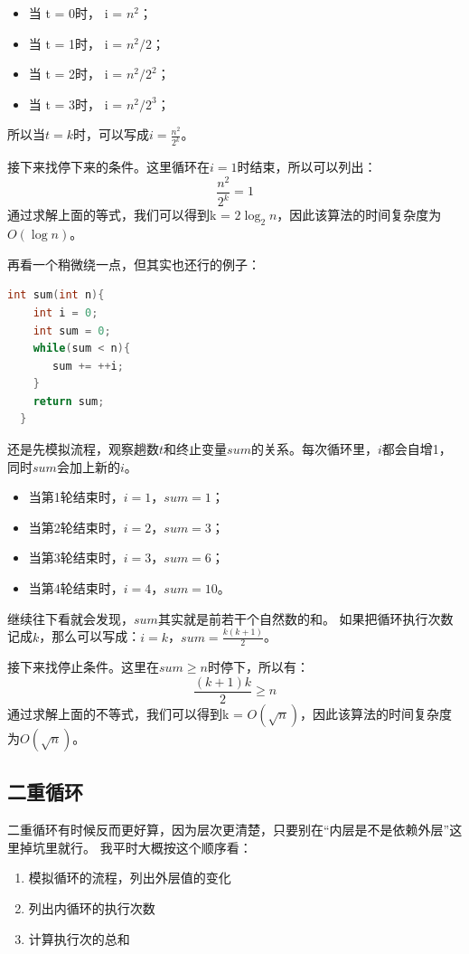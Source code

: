 \documentclass[b5paper,11pt]{article}
\begin{document}
\begin{itemize}
  \item 当 t = 0时， i = $n^2$；
  \item 当 t = 1时， i = $n^2 / 2$；
  \item 当 t = 2时， i = $n^2 / 2^2$；
  \item 当 t = 3时， i = $n^2 / 2^3$；
\end{itemize}

所以当$t = k$时，可以写成$i = \frac{n^2}{2^k}$。

接下来找停下来的条件。这里循环在$i = 1$时结束，所以可以列出：
$$\frac{n^2}{2^k} = 1$$
通过求解上面的等式，我们可以得到k = $2 \log_2{n}$，因此该算法的时间复杂度为$O(\log n)$。

再看一个稍微绕一点，但其实也还行的例子：
\begin{lstlisting}[language=C]
  int sum(int n){
    int i = 0;
    int sum = 0;
    while(sum < n){
       sum += ++i;
    }
    return sum;
  }
\end{lstlisting}
还是先模拟流程，观察趟数$t$和终止变量$sum$的关系。每次循环里，$i$都会自增1，同时$sum$会加上新的$i$。
\begin{itemize}
  \item 当第1轮结束时，$i = 1$，$sum = 1$；
  \item 当第2轮结束时，$i = 2$，$sum = 3$；
  \item 当第3轮结束时，$i = 3$，$sum = 6$；
  \item 当第4轮结束时，$i = 4$，$sum = 10$。
\end{itemize}
继续往下看就会发现，$sum$其实就是前若干个自然数的和。
如果把循环执行次数记成$k$，那么可以写成：$i = k$，$sum = \frac{k(k+1)}{2}$。

接下来找停止条件。这里在$sum \geq n$时停下，所以有：
$$\frac{(k+1)k}{2} \geq n$$
通过求解上面的不等式，我们可以得到k = $O(\sqrt{n})$，因此该算法的时间复杂度为$O(\sqrt{n})$。

\subsection{二重循环}
二重循环有时候反而更好算，因为层次更清楚，只要别在“内层是不是依赖外层”这里掉坑里就行。
我平时大概按这个顺序看：
\begin{enumerate}
  \item 模拟循环的流程，列出外层值的变化
  \item 列出内循环的执行次数
  \item 计算执行次的总和
\end{enumerate}
\end{document}
